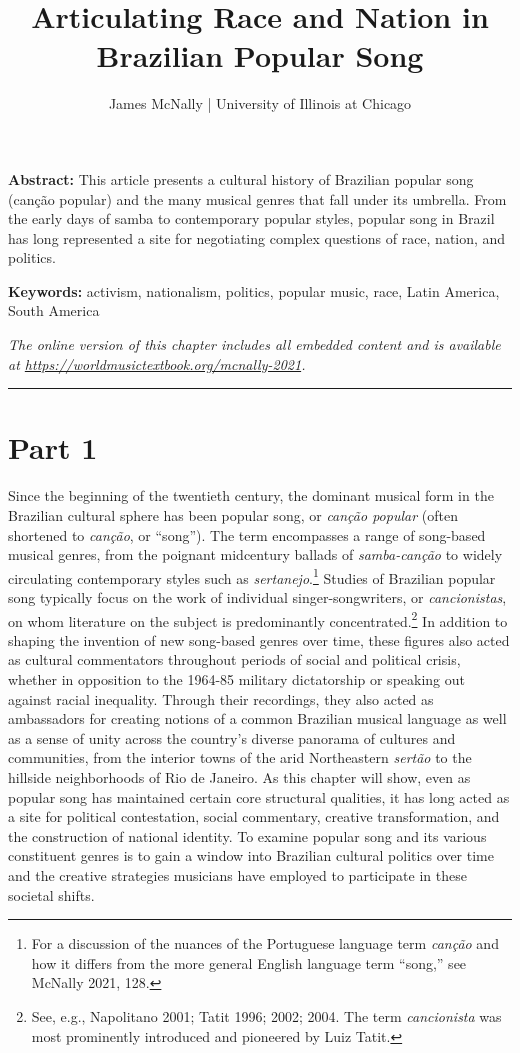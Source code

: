 \documentclass[twoside]{article}
\title{Articulating Race and Nation in Brazilian Popular Song}
\author{James McNally | University of Illinois at Chicago}
\date{}
\makeatletter
\renewcommand{\maketitle}{\bgroup\setlength{\parindent}{0pt}
\begin{flushleft}
  \vspace*{3\baselineskip}
  \huge{\textbf{\@title}}

  \medskip
  
  \large{\@author}
\end{flushleft}\egroup
}
\providecommand{\abstracttext}[1]
{
  \noindent
  \textbf{Abstract:} #1
}
\providecommand{\keywords}[1]
{
  \newline
  \textbf{Keywords:} #1
}
\providecommand{\wmturl}{\href{https://worldmusictextbook.org/mcnally-2021}{https://worldmusictextbook.org/mcnally-2021}}
\providecommand{\wmturltext}{
  \noindent\emph{The online version of this chapter includes all embedded content and is available at \wmturl.}
}
\makeatother
\begin{document}
\suppressfloats %
\maketitle

\abstracttext{This article presents a cultural history of Brazilian popular song (canção popular) and the many musical genres that fall under its umbrella. From the early days of samba to contemporary popular styles, popular song in Brazil has long represented a site for negotiating complex questions of race, nation, and politics.}
\keywords{activism, nationalism, politics, popular music, race, Latin America, South America}

\smallskip

\wmturltext

\medskip

\noindent\hfil\rule{0.5\textwidth}{0.4pt}\hfil

\bigskip

\section*{Part 1}

Since the beginning of the twentieth century, the dominant musical form
in the Brazilian cultural sphere has been popular song, or \emph{canção
popular} (often shortened to \emph{canção}, or ``song''). The term
encompasses a range of song-based musical genres, from the poignant
midcentury ballads of \emph{samba-canção} to widely circulating
contemporary styles such as \emph{sertanejo}.\footnote{For a discussion
  of the nuances of the Portuguese language term \emph{canção} and how
  it differs from the more general English language term ``song,'' see
  McNally 2021, 128.} Studies of Brazilian popular song typically focus
on the work of individual singer-songwriters, or \emph{cancionistas}, on
whom literature on the subject is predominantly concentrated.\footnote{See,
  e.g., Napolitano 2001; Tatit 1996; 2002; 2004. The term
  \emph{cancionista} was most prominently introduced and pioneered by
  Luiz Tatit.} In addition to shaping the invention of new song-based
genres over time, these figures also acted as cultural commentators
throughout periods of social and political crisis, whether in opposition
to the 1964-85 military dictatorship or speaking out against racial
inequality. Through their recordings, they also acted as ambassadors for
creating notions of a common Brazilian musical language as well as a
sense of unity across the country's diverse panorama of cultures and
communities, from the interior towns of the arid Northeastern
\emph{sertão} to the hillside neighborhoods of Rio de Janeiro. As this
chapter will show, even as popular song has maintained certain core
structural qualities, it has long acted as a site for political
contestation, social commentary, creative transformation, and the
construction of national identity. To examine popular song and its
various constituent genres is to gain a window into Brazilian cultural
politics over time and the creative strategies musicians have employed
to participate in these societal shifts.
\end{document}
